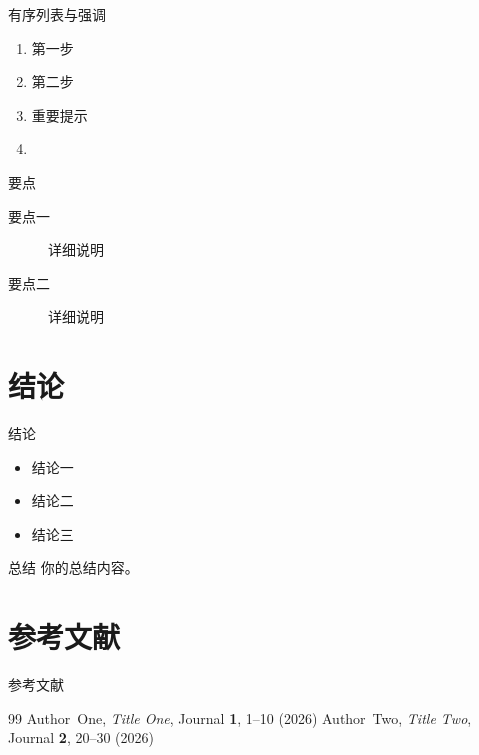 \documentclass[10pt,aspectratio=169]{beamer}
\begin{document}
\begin{frame}{有序列表与强调}
  \begin{enumerate}
    \item 第一步
    \item 第二步
    \item \alert{重要提示}
    \item {}
  \end{enumerate}

  \vspace{.5cm}
  \begin{block}{要点}
    \begin{description}
      \item[要点一] 详细说明
      \item[要点二] 详细说明
    \end{description}
  \end{block}
\end{frame}

\section{结论}
\begin{frame}{结论}
  \begin{itemize}
    \item 结论一
    \item 结论二
    \item 结论三
  \end{itemize}

  \vspace{.5cm}
  \begin{exampleblock}{总结}
    你的总结内容。
  \end{exampleblock}
\end{frame}

\section{参考文献}
\begin{frame}{参考文献}
  \begin{thebibliography}{99}
      Author~One, \textit{Title One}, Journal \textbf{1}, 1--10 (2026)
      Author~Two, \textit{Title Two}, Journal \textbf{2}, 20--30 (2026)
  \end{thebibliography}
\end{frame}
\end{document}
